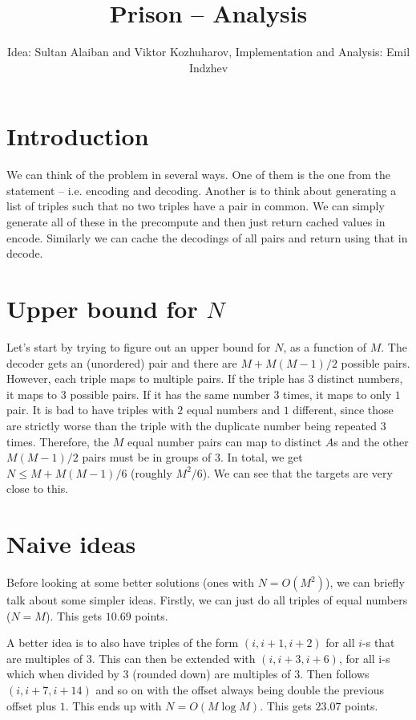 \documentclass{article}
\title{Prison -- Analysis}
\author{Idea: Sultan Alaiban and Viktor Kozhuharov, Implementation and Analysis: Emil Indzhev}
\date{}
\begin{document}
\maketitle

\section{Introduction}

We can think of the problem in several ways. One of them is the one from the statement -- i.e. encoding and decoding. Another is to think about generating a list of triples such that no two triples have a pair in common. We can simply generate all of these in the precompute and then just return cached values in encode. Similarly we can cache the decodings of all pairs and return using that in decode.

\section{Upper bound for $N$}

Let's start by trying to figure out an upper bound for $N$, as a function of $M$. The decoder gets an (unordered) pair and there are $M + M(M - 1) / 2$ possible pairs. However, each triple maps to multiple pairs. If the triple has $3$ distinct numbers, it maps to 3 possible pairs. If it has the same number $3$ times, it maps to only $1$ pair. It is bad to have triples with $2$ equal numbers and $1$ different, since those are strictly worse than the triple with the duplicate number being repeated $3$ times. Therefore, the $M$ equal number pairs can map to distinct $A$s and the other $M(M - 1) / 2$ pairs must be in groups of $3$. In total, we get $N \leq M + M(M - 1) / 6$ (roughly $M^2 / 6$). We can see that the targets are very close to this.

\section{Naive ideas}

Before looking at some better solutions (ones with $N = O(M^2)$), we can briefly talk about some simpler ideas. Firstly, we can just do all triples of equal numbers ($N = M$). This gets $10.69$ points.

A better idea is to also have triples of the form $(i, i+1, i+2)$ for all $i$-s that are multiples of $3$. This can then be extended with $(i, i+3, i+6)$, for all i-s which when divided by $3$ (rounded down) are multiples of $3$. Then follows $(i, i+7, i+14)$ and so on with the offset always being double the previous offset plus $1$. This ends up with $N = O(M \log M)$. This gets $23.07$ points.
\end{document}
